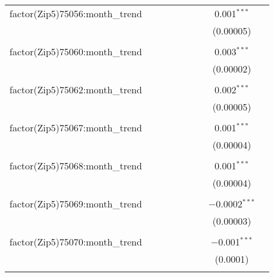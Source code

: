 \begin{table}[H]
{\begin{tabular}{@{\extracolsep{5pt}}lcccccccc}
  factor(Zip5)75056:month\_trend &  &  &  &  &  &  & 0.001$^{***}$ &  \\  

   &  &  &  &  &  &  & (0.00005) &  \\  

   & & & & & & & & \\  

  factor(Zip5)75060:month\_trend &  &  &  &  &  &  & 0.003$^{***}$ &  \\  

   &  &  &  &  &  &  & (0.00002) &  \\  

   & & & & & & & & \\  

  factor(Zip5)75062:month\_trend &  &  &  &  &  &  & 0.002$^{***}$ &  \\  

   &  &  &  &  &  &  & (0.00005) &  \\  

   & & & & & & & & \\  

  factor(Zip5)75067:month\_trend &  &  &  &  &  &  & 0.001$^{***}$ &  \\  

   &  &  &  &  &  &  & (0.00004) &  \\  

   & & & & & & & & \\  

  factor(Zip5)75068:month\_trend &  &  &  &  &  &  & 0.001$^{***}$ &  \\  

   &  &  &  &  &  &  & (0.00004) &  \\  

   & & & & & & & & \\  

  factor(Zip5)75069:month\_trend &  &  &  &  &  &  & $-$0.0002$^{***}$ &  \\  

   &  &  &  &  &  &  & (0.00003) &  \\  

   & & & & & & & & \\  

  factor(Zip5)75070:month\_trend &  &  &  &  &  &  & $-$0.001$^{***}$ &  \\  

   &  &  &  &  &  &  & (0.0001) &  \\  

   & & & & & & & & \\  


\end{tabular}}
\end{table}
